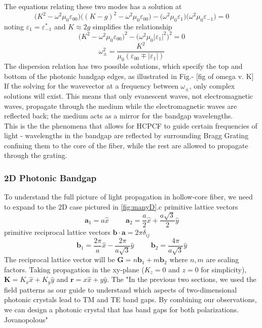 The equations relating these two modes has a solution at
\begin{equation}
		\big(K^2-\omega^2\mu_0\varepsilon_{00}\big)\big((K-g)^2-\omega^2\mu_0\varepsilon_{00}\big) -\big(\omega^2\mu_0\varepsilon_1\big)\big(\omega^2\mu_0\varepsilon_{-1}\big)  = 0 
\end{equation}
 noting $\varepsilon_1 = \varepsilon_{-1}^*$ and $K\approx2g$ simplifies the relationship 
 \begin{equation}
 	\big(K^2-\omega^2\mu_0\varepsilon_{00}\big)^2 -\big(\omega^2\mu_0|\varepsilon_{1}|^2\big)^2  = 0 
 \end{equation}
\begin{equation}
	\omega_{\pm}^2 = \frac{K^2}{\mu_0(\varepsilon_{00}\mp|\varepsilon_1|)}
\end{equation}
The dispersion relation has two possible solutions, which specify the top and bottom of the photonic bandgap edges, as illustrated in Fig.-  
[fig of omega v. K]
If the solving for the wavevector at a frequency between $\omega_{\pm}$, only complex solutions will exist. This means that only evanescent waves, not electromagnetic waves, propagate through the medium while the electromagnetic waves are reflected back; the medium acts as a mirror for the bandgap wavelengths.\\
This is the the phenomena that allows for HCPCF to guide certain frequencies of light - wavelengths in the bandgap are reflected by surrounding Bragg Grating confining them to the core of the fiber, while the rest are allowed to propagate through the grating. 

\subsubsection{2D Photonic Bandgap}
To understand the full picture of  light propagation in hollow-core fiber, we need to expand to the 2D case pictured in  \ref{fig:manyD}.c
primitive lattice vectors
\begin{equation}
	\boldsymbol{a}_1 = a\hat{x} \hspace{1cm} \boldsymbol{a}_2 = \frac{a}{2}\hat{x}+\frac{a\sqrt{3}}{2}\hat{y}
\end{equation}
primitive reciprocal lattice vectors $\boldsymbol{b}\cdot\boldsymbol{a} = 2\pi\delta_{ij}$
\begin{equation}
	\boldsymbol{b}_1 = \frac{2\pi}{a}\hat{x}-\frac{2\pi}{a\sqrt{3}}\hat{y} \hspace{1cm} \boldsymbol{b}_2 =\frac{4\pi}{a\sqrt{3}}\hat{y} 
\end{equation}
The reciprocal lattice vector will be $\boldsymbol{G} = n\boldsymbol{b}_1 + m\boldsymbol{b}_2$ where $n, m$ are scaling factors. 
Taking propagation in the xy-plane ($K_z=0$ and $z=0$ for simplicity), $\boldsymbol{K}=K_x\hat{x}+K_y\hat{y}$ and $\boldsymbol{r}=x\hat{x}+y\hat{y}$. The 
"In the previous two sections, we used the field patterns as our guide to understand
which aspects of two-dimensional photonic crystals lead to TM and TE band gaps.
By combining our observations, we can design a photonic crystal that has band
gaps for both polarizations. Jovanopolous"

